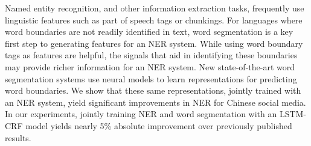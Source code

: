 Named entity recognition, and other information extraction tasks, frequently use linguistic features such as part of speech tags or chunkings. For languages where word boundaries are not readily identified in text, word segmentation is a key first step to generating features for an NER system. While using word boundary tags as features are helpful, the signals that aid in identifying these boundaries may provide richer information for an NER system. New state-of-the-art word segmentation systems use neural models to learn representations for predicting word boundaries. We show that these same representations, jointly trained with an NER system, yield significant improvements in NER for Chinese social media. In our experiments, jointly training NER and word segmentation with an LSTM-CRF model yields nearly 5\% absolute improvement over previously published results.
